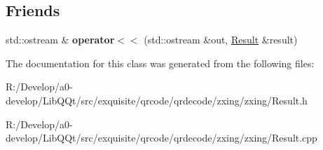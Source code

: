 \subsection*{Friends}
\begin{DoxyCompactItemize}
\item 
\mbox{\label{classzxing_1_1_result_af56d0651dc870ed40b911f7dd79c4692}} 
std\+::ostream \& {\bfseries operator$<$$<$} (std\+::ostream \&out, \mbox{\hyperlink{classzxing_1_1_result}{Result}} \&result)
\end{DoxyCompactItemize}


The documentation for this class was generated from the following files\+:\begin{DoxyCompactItemize}
\item 
R\+:/\+Develop/a0-\/develop/\+Lib\+Q\+Qt/src/exquisite/qrcode/qrdecode/zxing/zxing/Result.\+h\item 
R\+:/\+Develop/a0-\/develop/\+Lib\+Q\+Qt/src/exquisite/qrcode/qrdecode/zxing/zxing/Result.\+cpp\end{DoxyCompactItemize}
